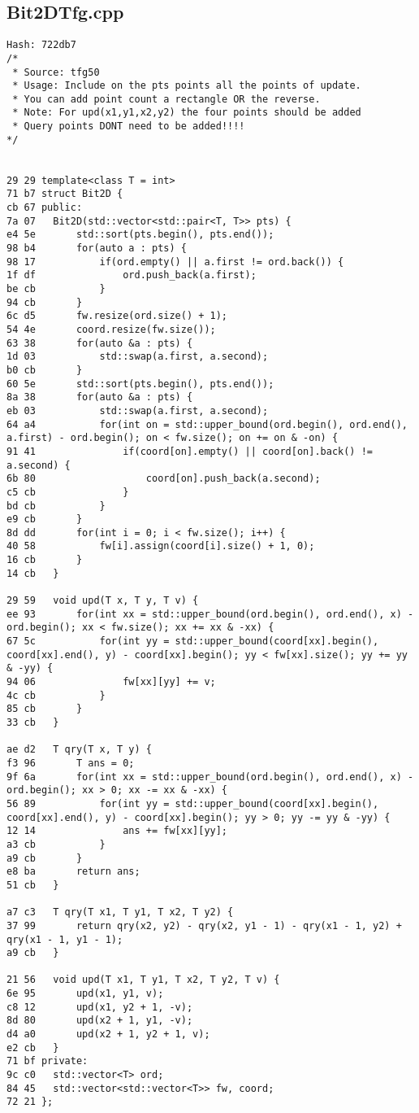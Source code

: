 \documentclass[11pt, a4paper, twoside]{article}
\begin{document}
\subsection{Bit2DTfg.cpp}
\begin{lstlisting}
Hash: 722db7
/*
 * Source: tfg50
 * Usage: Include on the pts points all the points of update. 
 * You can add point count a rectangle OR the reverse.
 * Note: For upd(x1,y1,x2,y2) the four points should be added
 * Query points DONT need to be added!!!!
*/


29 29 template<class T = int>
71 b7 struct Bit2D {
cb 67 public:
7a 07 	Bit2D(std::vector<std::pair<T, T>> pts) {
e4 5e 		std::sort(pts.begin(), pts.end());
98 b4 		for(auto a : pts) {
98 17 			if(ord.empty() || a.first != ord.back()) {
1f df 				ord.push_back(a.first);
be cb 			}
94 cb 		}
6c d5 		fw.resize(ord.size() + 1);
54 4e 		coord.resize(fw.size());
63 38 		for(auto &a : pts) {
1d 03 			std::swap(a.first, a.second);
b0 cb 		}
60 5e 		std::sort(pts.begin(), pts.end());
8a 38 		for(auto &a : pts) {
eb 03 			std::swap(a.first, a.second);
64 a4 			for(int on = std::upper_bound(ord.begin(), ord.end(), a.first) - ord.begin(); on < fw.size(); on += on & -on) {
91 41 				if(coord[on].empty() || coord[on].back() != a.second) {
6b 80 					coord[on].push_back(a.second);
c5 cb 				}
bd cb 			}
e9 cb 		}
8d dd 		for(int i = 0; i < fw.size(); i++) {
40 58 			fw[i].assign(coord[i].size() + 1, 0);
16 cb 		}
14 cb 	}
      
29 59 	void upd(T x, T y, T v) {
ee 93 		for(int xx = std::upper_bound(ord.begin(), ord.end(), x) - ord.begin(); xx < fw.size(); xx += xx & -xx) {
67 5c 			for(int yy = std::upper_bound(coord[xx].begin(), coord[xx].end(), y) - coord[xx].begin(); yy < fw[xx].size(); yy += yy & -yy) {
94 06 				fw[xx][yy] += v;
4c cb 			}
85 cb 		}
33 cb 	}
      
ae d2 	T qry(T x, T y) {
f3 96 		T ans = 0;
9f 6a 		for(int xx = std::upper_bound(ord.begin(), ord.end(), x) - ord.begin(); xx > 0; xx -= xx & -xx) {
56 89 			for(int yy = std::upper_bound(coord[xx].begin(), coord[xx].end(), y) - coord[xx].begin(); yy > 0; yy -= yy & -yy) {
12 14 				ans += fw[xx][yy];
a3 cb 			}
a9 cb 		}
e8 ba 		return ans;
51 cb 	}
      
a7 c3 	T qry(T x1, T y1, T x2, T y2) {
37 99 		return qry(x2, y2) - qry(x2, y1 - 1) - qry(x1 - 1, y2) + qry(x1 - 1, y1 - 1);
a9 cb 	}
      
21 56 	void upd(T x1, T y1, T x2, T y2, T v) {
6e 95 		upd(x1, y1, v);
c8 12 		upd(x1, y2 + 1, -v);
8d 80 		upd(x2 + 1, y1, -v);
d4 a0 		upd(x2 + 1, y2 + 1, v);
e2 cb 	}
71 bf private:
9c c0 	std::vector<T> ord;
84 45 	std::vector<std::vector<T>> fw, coord;
72 21 };
\end{lstlisting}
\end{document}
